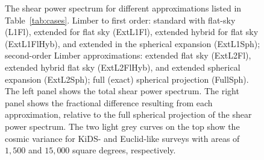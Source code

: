 \documentclass[fleqn,usenatbib]{mnras} %
\begin{document}
\begin{figure}
\begin{center}
{    }
  \end{center}

  \caption{\label{fig:Cl_cases}%
        The shear power spectrum for different approximations listed in Table~\ref{tab:cases}.
        Limber to first order: standard with flat-sky (L1Fl),
        extended for flat sky (ExtL1Fl), extended hybrid for flat sky (ExtL1FlHyb),
        and extended in the spherical expansion (ExtL1Sph);
        second-order Limber approximations: extended flat sky (ExtL2Fl), extended hybrid flat sky (ExtL2FlHyb),
        and extended spherical expansion (ExtL2Sph); full (exact) spherical projection (FullSph).
        The left panel shows the total shear power spectrum.  The right panel shows the fractional difference
        resulting from each approximation, 
        relative to the full spherical projection of the shear power spectrum. The two light grey curves on the
        top show the cosmic variance for KiDS- and Euclid-like surveys with areas of $1,500$ and $15,000$
        square degrees, respectively.
        }
\end{figure}


\end{document}
